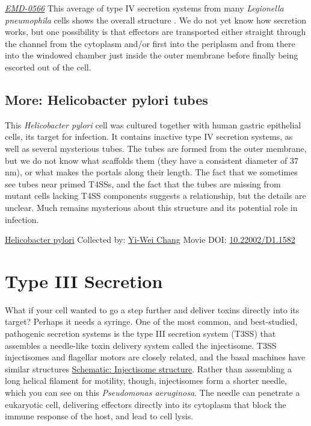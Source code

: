 \documentclass[]{tufte-book}
\begin{document}
\href{https://www.ebi.ac.uk/pdbe/entry/emdb/EMD-0566}{\emph{EMD-0566}}
This average of type IV secretion systems from many \emph{Legionella pneumophila} cells shows the overall structure \citep{ghosal2019a}. We do not yet know how secretion works, but one possibility is that effectors are transported either straight through the channel from the cytoplasm and/or first into the periplasm and from there into the windowed chamber just inside the outer membrane before finally being escorted out of the cell.

\hypertarget{Helicobacter_pylori_tubes}{%
\subsection*{More: Helicobacter pylori tubes}\label{Helicobacter_pylori_tubes}}

This \emph{Helicobacter pylori} cell was cultured together with human gastric epithelial cells, its target for infection. It contains inactive type IV secretion systems, as well as several mysterious tubes. The tubes are formed from the outer membrane, but we do not know what scaffolds them (they have a consistent diameter of 37 nm), or what makes the portals along their length. The fact that we sometimes see tubes near primed T4SSs, and the fact that the tubes are missing from mutant cells lacking T4SS components suggests a relationship, but the details are unclear. Much remains mysterious about this structure and its potential role in infection.



\hypertarget{htmlwidget-276fc19ab466d53b0363}{}

\label{fig:9-3a}\protect\hyperlink{tree}{Helicobacter pylori} Collected by: \protect\hyperlink{yi-wei_chang}{Yi-Wei Chang} Movie DOI: \href{https://doi.org/10.22002/D1.1582}{10.22002/D1.1582}

\hypertarget{type-iii-secretion}{%
\section{Type III Secretion}\label{type-iii-secretion}}

What if your cell wanted to go a step further and deliver toxins directly into its target? Perhaps it needs a syringe. One of the most common, and best-studied, pathogenic secretion systems is the type III secretion system (T3SS) that assembles a needle-like toxin delivery system called the injectisome. T3SS injectisomes and flagellar motors are closely related, and the basal machines have similar structures \protect\hyperlink{Injectisome_structure}{Schematic: Injectisome structure}. Rather than assembling a long helical filament for motility, though, injectisomes form a shorter needle, which you can see on this \emph{Pseudomonas aeruginosa}. The needle can penetrate a eukaryotic cell, delivering effectors directly into its cytoplasm that block the immune response of the host, and lead to cell lysis.
\end{document}
